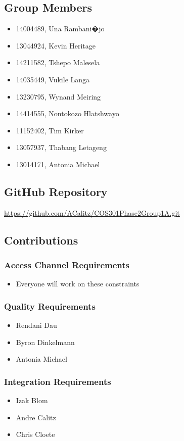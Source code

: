 \documentclass[a4paper,12pt]{report}
\begin{document}
		\subsection{Group Members}
			\begin{itemize}
				\item 14004489, Una Rambani�jo
				\item 13044924, Kevin Heritage
				\item 14211582, Tshepo Malesela
				\item 14035449, Vukile Langa
				\item 13230795, Wynand Meiring
				\item 14414555, Nontokozo Hlatshwayo
				\item 11152402, Tim Kirker
				\item 13057937, Thabang Letageng
				\item 13014171, Antonia Michael
			\end{itemize}
		\subsection{GitHub Repository}
			\url{https://github.com/ACalitz/COS301Phase2Group1A.git}
		\subsection{Contributions}
			\subsubsection{Access Channel Requirements}
				\begin{itemize}
					\item Everyone will work on these constraints
				\end{itemize}
			\subsubsection{Quality Requirements}  
				\begin{itemize}
					\item Rendani Dau
					\item Byron Dinkelmann
					\item Antonia Michael
				\end{itemize}
			\subsubsection{Integration Requirements}  
				\begin{itemize}
					\item Izak Blom
					\item Andre Calitz
					\item Chris Cloete
				\end{itemize}
\end{document}
